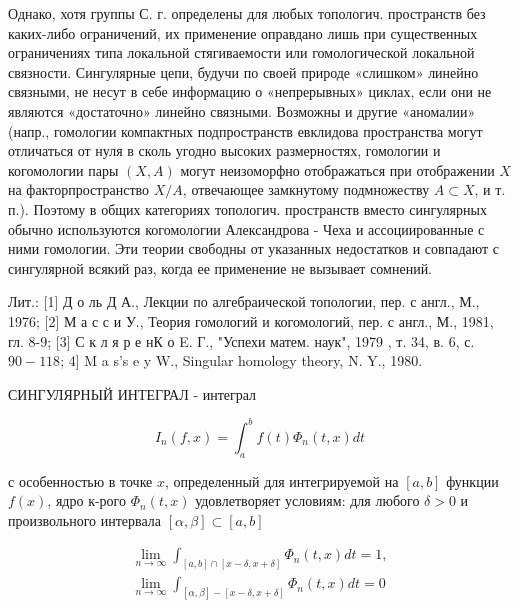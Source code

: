 \documentclass[10pt]{article}
\begin{document}
Однако, хотя группы С. г. определены для любых топологич. пространств без каких-либо ограничений, их применение оправдано лишь при существенных ограничениях типа локальной стягиваемости или гомологической локальной связности. Сингулярные цепи, будучи по своей природе «слишком» линейно связными, не несут в себе информацию о «непрерывных» циклах, если они не являются «достаточно» линейно связными. Возможны и другие «аномалии» (напр., гомологии компактных подпространств евклидова пространства могут отличаться от нуля в сколь угодно высоких размерностях, гомологии и когомологии пары $(X, A)$ могут неизоморфно отображаться при отображении $X$ на факторпространство $X / A$, отвечающее замкнутому подмножеству $A \subset X$, и т. п.). Поэтому в общих категориях топологич. пространств вместо сингулярных обычно используются когомологии Александрова - Чеха и ассоциированные с ними гомологии. Эти теории свободны от указанных недостатков и совпадают с сингулярной всякий раз, когда ее применение не вызывает сомнений.



Лит.: [1] Д о ль Д А., Лекции по алгебраической топологии, пер. с англ., М., 1976; [2] М а с с и У., Теория гомологий и когомологий, пер. с англ., М., 1981, гл. 8-9; [3] С к л я р е нК о E. Г., "Успехи матем. наук", 1979 , т. 34, в. 6, с. $90-118$; 4] M a s's e y W., Singular homology theory, N. Y., 1980.



СИНГУЛЯРНЫЙ ИНТЕГРАЛ - интеграл



\[

I_{n}(f, x)=\int_{a}^{b} f(t) \Phi_{n}(t, x) d t

\]



с особенностью в точке $x$, определенный для интегрируемой на $[a, b]$ функции $f(x)$, ядро к-рого $\Phi_{n}(t, x)$ удовлетворяет условиям: для любого $\delta>0$ и произвольного интервала $[\alpha, \beta] \subset[a, b]$



\[

\begin{gathered}

\lim _{n \rightarrow \infty} \int_{[a, b] \cap[x-\delta, x+\delta]} \Phi_{n}(t, x) d t=1, \\

\lim _{n \rightarrow \infty} \int_{[\alpha, \beta]-[x-\delta, x+\delta]} \Phi_{n}(t, x) d t=0

\end{gathered}

\]
\end{document}

